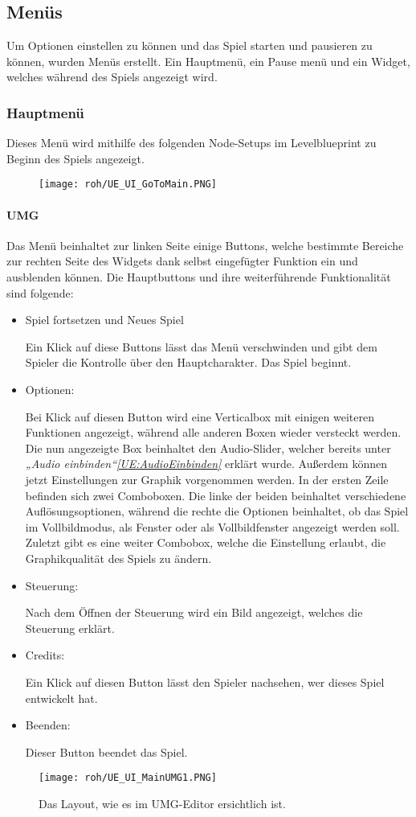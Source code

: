 \subsection{Menüs}
Um Optionen einstellen zu können und das Spiel starten und pausieren zu können, wurden Menüs erstellt. Ein Hauptmenü, ein Pause menü und ein Widget, welches während des Spiels angezeigt wird.
\subsubsection{Hauptmenü}
Dieses Menü wird mithilfe des folgenden Node-Setups im Levelblueprint zu Beginn des Spiels angezeigt.
\begin{figure}[H]
    \centering
    \texttt{[image: roh/UE\_UI\_GoToMain.PNG]}
    \label{UE:UI_GoToMain}
\end{figure}
\paragraph{UMG}
Das Menü beinhaltet zur linken Seite einige Buttons, welche bestimmte Bereiche zur rechten Seite des Widgets dank selbst eingefügter Funktion ein und ausblenden können.
Die Hauptbuttons und ihre weiterführende Funktionalität sind folgende:
\begin{itemize}
    \item Spiel fortsetzen und Neues Spiel

    Ein Klick auf diese Buttons lässt das Menü verschwinden und gibt dem Spieler die Kontrolle über den Hauptcharakter. Das Spiel beginnt.
    \item Optionen:

    Bei Klick auf diesen Button wird eine Verticalbox mit einigen weiteren Funktionen angezeigt, während alle anderen Boxen wieder versteckt werden. Die nun angezeigte Box beinhaltet den Audio-Slider, welcher bereits unter \textit{„Audio einbinden“\ref{UE:AudioEinbinden}} erklärt wurde. Außerdem können jetzt Einstellungen zur Graphik vorgenommen werden. In der ersten Zeile befinden sich zwei Comboboxen. Die linke der beiden beinhaltet verschiedene Auflösungsoptionen, während die rechte die Optionen beinhaltet, ob das Spiel im Vollbildmodus, als Fenster oder als Vollbildfenster angezeigt werden soll. Zuletzt gibt es eine weiter Combobox, welche die Einstellung erlaubt, die Graphikqualität des Spiels zu ändern.
    \item Steuerung:

    Nach dem Öffnen der Steuerung wird ein Bild angezeigt, welches die Steuerung erklärt.
    \item Credits:

    Ein Klick auf diesen Button lässt den Spieler nachsehen, wer dieses Spiel entwickelt hat.
    \item Beenden:

    Dieser Button beendet das Spiel.
\end{itemize}
\begin{figure}[H]
    \centering
    \texttt{[image: roh/UE\_UI\_MainUMG1.PNG]}
    \caption{Das Layout, wie es im UMG-Editor ersichtlich ist.}
    \label{UE:UI_MainUMG1}
\end{figure}
